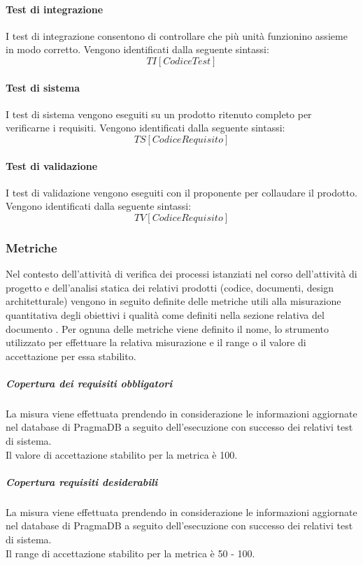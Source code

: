 	\paragraph{Test di integrazione}
		I test di integrazione consentono di controllare che più unità funzionino assieme in modo corretto. Vengono identificati dalla seguente sintassi:
			\[TI[Codice Test]\]
	\paragraph{Test di sistema}
		I test di sistema vengono eseguiti su un prodotto ritenuto completo per verificarne i requisiti. Vengono identificati dalla seguente sintassi:
			\[TS[Codice Requisito]\]
	\paragraph{Test di validazione}
		I test di validazione vengono eseguiti con il proponente per collaudare il prodotto. Vengono identificati dalla seguente sintassi:
			\[TV[Codice Requisito]\]

\subsubsection{Metriche}
	Nel contesto dell'attività di verifica dei processi istanziati nel corso dell'attività di progetto e dell'analisi statica dei relativi prodotti (codice, documenti, design architetturale) vengono in seguito definite delle metriche utili alla misurazione quantitativa degli obiettivi i qualità come definiti nella sezione relativa del documento \PdQ .
	Per ognuna delle metriche viene definito il nome, lo strumento utilizzato per effettuare la relativa misurazione e il range o il valore di accettazione per essa stabilito.
	
			
			\subparagraph{Copertura dei requisiti obbligatori}
			La misura viene effettuata prendendo in considerazione le informazioni aggiornate nel database di PragmaDB a seguito dell'esecuzione con successo dei relativi test di sistema.
			\\Il valore di accettazione stabilito per la metrica è 100.
			
			\subparagraph{Copertura requisiti desiderabili}
			La misura viene effettuata prendendo in considerazione le informazioni aggiornate nel database di PragmaDB a seguito dell'esecuzione con successo dei relativi test di sistema.
			\\Il range di accettazione stabilito per la metrica è 50 - 100.
		
